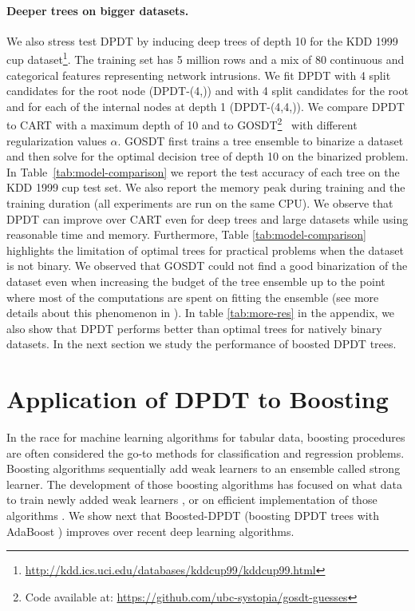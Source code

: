 \paragraph{Deeper trees on bigger datasets.} We also stress test DPDT by inducing deep trees of depth 10 for the KDD 1999 cup dataset\footnote{\url{http://kdd.ics.uci.edu/databases/kddcup99/kddcup99.html}}. The training set has 5 million rows and a mix of 80 continuous and categorical features representing network intrusions. We fit DPDT with 4 split candidates for the root node (DPDT-(4,)) and with 4 split candidates for the root and for each of the internal nodes at depth 1 (DPDT-(4,4,)). We compare DPDT to CART with a maximum depth of 10 and to GOSDT\footnote{Code available at: \url{https://github.com/ubc-systopia/gosdt-guesses}}~\cite{McTavish_Zhong_Achermann_Karimalis_Chen_Rudin_Seltzer_2022} with different regularization values $\alpha$. GOSDT first trains a tree ensemble to binarize a dataset and then solve for the optimal decision tree of depth 10 on the binarized problem. In Table~\ref{tab:model-comparison} we report the test accuracy of each tree on the KDD 1999 cup test set. We also report the memory peak during training and the training duration (all experiments are run on the same CPU). We observe that DPDT can improve over CART even for deep trees and large datasets while using reasonable time and memory. Furthermore, Table \ref{tab:model-comparison} highlights the limitation of optimal trees for practical problems when the dataset is not binary. We observed that GOSDT could not find a good binarization of the dataset even when increasing the budget of the tree ensemble up to the point where most of the computations are spent on fitting the ensemble (see more details about this phenomenon in \cite[Section 5.3]{McTavish_Zhong_Achermann_Karimalis_Chen_Rudin_Seltzer_2022}). In table \ref{tab:more-res} in the appendix, we also show that DPDT performs better than optimal trees for natively binary datasets. In the next section we study the performance of boosted DPDT trees.

\section{Application of DPDT to Boosting}

In the race for machine learning algorithms for tabular data, boosting procedures are often considered the go-to methods for classification and regression problems. Boosting algorithms \cite{FREUND1997119,stcohFriedman,FriedmanBoosting} sequentially add weak learners to an ensemble called strong learner. The development of those boosting algorithms has focused on what data to train newly added weak learners \cite{stcohFriedman,FriedmanBoosting},  or on efficient implementation of those algorithms \cite{xgb,10.5555/3327757.3327770}. We show next that Boosted-DPDT (boosting DPDT trees with AdaBoost \cite{FREUND1997119}) improves over recent deep learning algorithms. 


